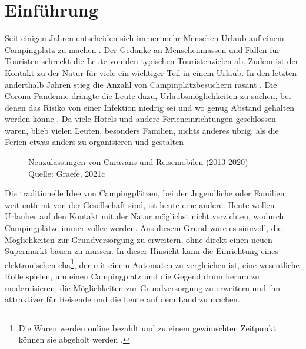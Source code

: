 \section{Einführung}


Seit einigen Jahren entscheiden sich immer mehr Menschen Urlaub auf einem Campingplatz zu machen 
\cite{periodical:ANST}. Der Gedanke an Menschenmassen und Fallen für Touristen schreckt die Leute von 
den typischen Touristenzielen ab. Zudem ist der Kontakt zu der Natur für viele ein wichtiger Teil 
in einem Urlaub. In den letzten anderthalb Jahren stieg die Anzahl von Campinplatzbesuchern rasant
\cite{periodical:UBST}. Die Corona-Pandemie drängte die Leute dazu, Urlaubsmöglichkeiten zu suchen, 
bei denen das Risiko von einer Infektion niedrig sei und wo genug Abstand gehalten werden könne
\cite{periodical:AUST}. Da viele Hotels und andere Ferieneinrichtungen geschlossen waren, blieb 
vielen Leuten, besonders Familien, nichts anderes übrig, als die Ferien etwas anders zu organisieren 
und gestalten 

\vfill
\begin{figure}[H]
    \caption{Neuzulassungen von Caravans und Reisemobilen (2013-2020) \\ Quelle: Graefe, 2021c}
    \label{fig:periodical_ANST}
\end{figure}

Die traditionelle Idee von Campingplätzen, bei der Jugendliche oder Familien weit entfernt von der 
Gesellschaft sind, ist heute eine andere. Heute wollen Urlauber auf den Kontakt mit der Natur
möglichst nicht verzichten, wodurch Campingplätze immer voller werden. Aus diesem Grund wäre es
sinnvoll, die Möglichkeiten zur Grundversorgung zu erweitern, ohne direkt einen neuen Supermarkt
bauen zu müssen. In dieser Hinsicht kann die Einrichtung eines elektronischen \acrfull{cba}\footnote{Die
Waren werden online bezahlt und zu einem gewünschten Zeitpunkt können sie abgeholt werden \cite{refart:ECPG}.},
der mit einem Automaten zu vergleichen ist, eine wesentliche Rolle spielen, um einen Campingplatz und die 
Gegend drum herum zu modernisieren, die Möglichkeiten zur Grundversorgung zu erweitern und ihn attraktiver
für Reisende und die Leute auf dem Land zu machen.


